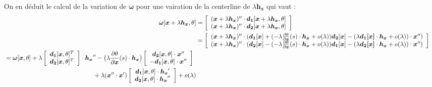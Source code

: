 On en déduit le calcul de la variation de $\boldsymbol{\omega}$ pour une vairation de la centerline de $\lambda \boldsymbol{h_x}$ qui vaut :
\begin{align}
	\boldsymbol{\omega}[\boldsymbol{x}+\lambda \boldsymbol{h_x},\theta]
	& =
	\left[\begin{array}{c}
	(\boldsymbol{x}+\lambda \boldsymbol{h_x})'' \cdot  \boldsymbol{d_1}[\boldsymbol{x}+\lambda \boldsymbol{h_x},\theta]\\
	(\boldsymbol{x}+\lambda \boldsymbol{h_x})'' \cdot \boldsymbol{d_2}[\boldsymbol{x}+\lambda \boldsymbol{h_x},\theta]\\
	\end{array}\right] \notag\\
	& = 
	\left[\begin{array}{c}
	(\boldsymbol{x}+\lambda \boldsymbol{h_x})'' \cdot ( 	\boldsymbol{d_1}[\boldsymbol{x}] 
												+ (-\lambda\frac{\partial \theta}{\partial \boldsymbol{x}}(s) \cdot \boldsymbol{h_x} + o(\lambda))\boldsymbol{d_2}[\boldsymbol{x}]
												- (\lambda \boldsymbol{d_1[\boldsymbol{x}]}\cdot\boldsymbol{h_x} + o(\lambda)) \cdot \boldsymbol{x}''
											)\\
	(\boldsymbol{x}+\lambda \boldsymbol{h_x})'' \cdot ( 	\boldsymbol{d_2}[\boldsymbol{x}] 
												- (-\lambda\frac{\partial \theta}{\partial \boldsymbol{x}}(s) \cdot \boldsymbol{h_x} + o(\lambda))\boldsymbol{d_1}[\boldsymbol{x}]
												- (\lambda \boldsymbol{d_2[\boldsymbol{x}]}\cdot\boldsymbol{h_x} + o(\lambda)) \cdot \boldsymbol{x}''
											)\\
	\end{array}\right] \notag\\
	  \begin{split}
      		& = \boldsymbol{\omega}[\boldsymbol{x},\theta] +
        			\lambda
        			\left[\begin{array}{c}
        			\boldsymbol{d_1}[\boldsymbol{x},\theta]^T \\
        			\boldsymbol{d_2}[\boldsymbol{x},\theta]^T
        			\end{array}\right] \cdot \boldsymbol{h_x}'' 
        			 -
        			\big(\lambda\frac{\partial \theta}{\partial \boldsymbol{x}}(s) \cdot \boldsymbol{h_x}\big)
        			\left[\begin{array}{c}
        			\boldsymbol{d_2}[\boldsymbol{x},\theta]\cdot \boldsymbol{x}''\\
        			-\boldsymbol{d_1}[\boldsymbol{x},\theta]\cdot \boldsymbol{x}''\\
        			\end{array}\right] \\
        		& \hspace{5cm}+ \lambda(\boldsymbol{x}'' \cdot \boldsymbol{x}')
        		\left[\begin{array}{c}
        		\boldsymbol{d_1}[\boldsymbol{x},\theta]\cdot \boldsymbol{h_x}'\\
        		\boldsymbol{d_2}[\boldsymbol{x},\theta]\cdot \boldsymbol{h_x}''\\
        		\end{array}\right]
        		 + o(\lambda)
 	 \end{split} \notag
\end{align}


